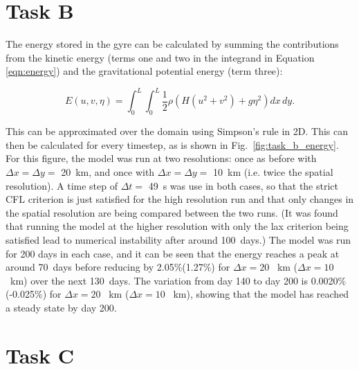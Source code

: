 \documentclass{article}
\begin{document}
\section*{Task B}

The energy stored in the gyre can be calculated by summing the contributions from the kinetic energy
(terms one and two in the integrand in Equation \ref{eqn:energy}) and the gravitational potential
energy (term three):

\begin{equation}
    \label{eqn:energy} 
    E(u, v, \eta) = \int_0^L \int_0^L \frac{1}{2} \rho ( H ( u^2 + v^2) + g \eta^2) dx\, dy.
\end{equation}

This can be approximated over the domain using Simpson's rule in 2D. This can then be calculated for
every timestep, as is shown in Fig.\ \ref{fig:task_b_energy}. For this figure, the model was run at
two resolutions: once as before with $\Delta x = \Delta y = $ \SI{20}{km}, and once with $\Delta x
= \Delta y = $ \SI{10}{km} (i.e. twice the spatial resolution). A time step of $\Delta t = $
\SI{49}{s} was use in both cases, so that the strict CFL criterion is just satisfied for the high
resolution run and that only changes in the spatial resolution are being compared between the two
runs. (It was found that running the model at the higher resolution with only the lax criterion
being satisfied lead to numerical instability after around \SI{100}{days}.) The model was run for 200
days in each case, and it can be seen that the energy reaches a peak at around \SI{70}{days} before
reducing by 2.05\%(1.27\%) for $\Delta x = 20$ \SI{}{km} ($\Delta x = 10$ \SI{}{km}) over the next
\SI{130}{days}. The variation from day 140 to day 200 is 0.0020\% (-0.025\%) for $\Delta x = 20$
\SI{}{km} ($\Delta x = 10$ \SI{}{km}), showing that the model has reached a steady state by day 200.

\section*{Task C}
\end{document}
